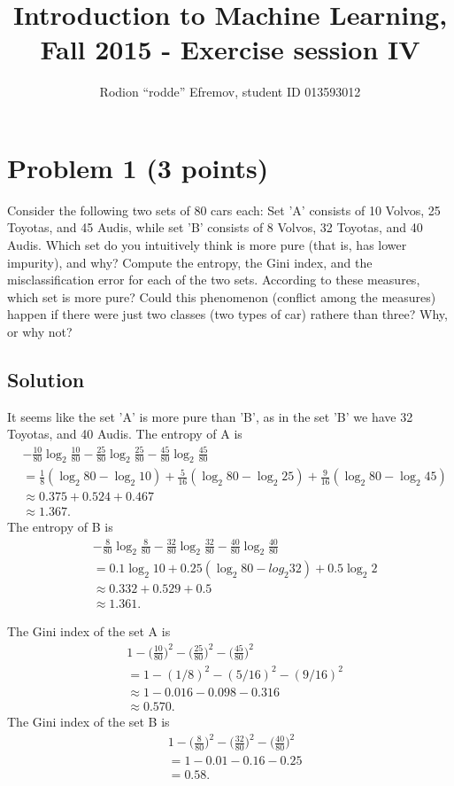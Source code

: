 \documentclass[10pt]{article}
\title{Introduction to Machine Learning, Fall 2015 - Exercise session IV}
\author{Rodion ``rodde'' Efremov, student ID 013593012}
\begin{document}
 \maketitle

\section*{Problem 1 (3 points)}
\color{blue}
Consider the following two sets of 80 cars each: Set 'A' consists of 10 Volvos, 25 Toyotas, and 45 Audis, while set 'B' consists of 8 Volvos, 32 Toyotas, and 40 Audis. Which set do you intuitively think is more pure (that is, has lower impurity), and why? Compute the entropy, the Gini index, and the misclassification error for each of the two sets. According to these measures, which set is more pure? Could this phenomenon (conflict among the measures) happen if there were just two classes (two types of car) rathere than three? Why, or why not?
\color{black}

\subsection*{Solution}
It seems like the set 'A' is more pure than 'B', as in the set 'B' we have 32 Toyotas, and 40 Audis. The entropy of A is 
\begin{align*} 
&-\frac{10}{80} \log_2 \frac{10}{80} - \frac{25}{80} \log_2 \frac{25}{80} - \frac{45}{80} \log_2 \frac{45}{80} \\
&= \frac{1}{8} (\log_2 80 - \log_2 10) + \frac{5}{16} (\log_2 80 - \log_2 25) + \frac{9}{16} (\log_2 80 - \log_2 45) \\
&\approx 0.375 + 0.524 + 0.467 \\
&\approx 1.367.
\end{align*}
The entropy of B is 
\begin{align*}
&-\frac{8}{80} \log_2 \frac{8}{80} - \frac{32}{80} \log_2 \frac{32}{80} - \frac{40}{80} \log_2 \frac{40}{80} \\
&= 0.1 \log_2 10 + 0.25 (\log_2 80 - log_2 32) + 0.5 \log_2 2 \\
&\approx 0.332 + 0.529 + 0.5 \\
&\approx 1.361.
\end{align*}

The Gini index of the set A is
\begin{align*}
&1 - \Bigg( \frac{10}{80} \Bigg)^2 - \Bigg( \frac{25}{80} \Bigg)^2 - \Bigg( \frac{45}{80} \Bigg)^2 \\
&= 1 - (1/8)^2 - (5/16)^2 - (9/16)^2 \\
&\approx 1 - 0.016 - 0.098 - 0.316 \\
&\approx 0.570.
\end{align*}
The Gini index of the set B is
\begin{align*}
&1 - \Bigg( \frac{8}{80} \Bigg)^2 - \Bigg( \frac{32}{80} \Bigg)^2 - \Bigg( \frac{40}{80} \Bigg)^2 \\
&= 1 - 0.01 - 0.16 - 0.25 \\
&= 0.58.
\end{align*}
\end{document}
